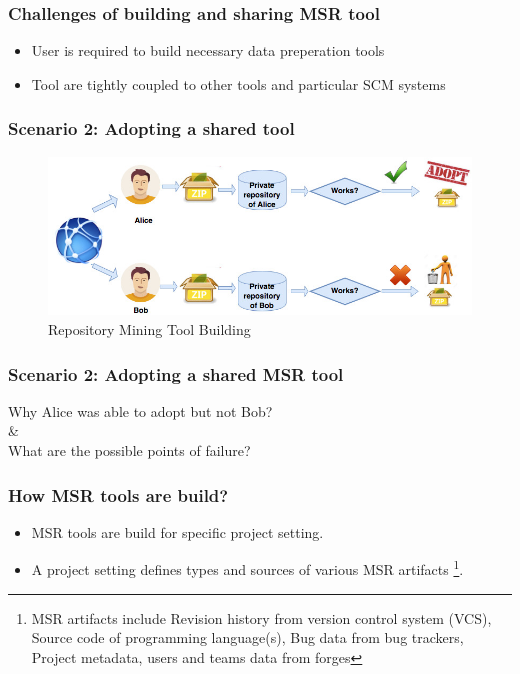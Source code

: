         \begin{frame}
            \frametitle{Challenges of building and sharing MSR tool}
            \begin{itemize}
                \item User is required to build necessary data preperation tools
                \item Tool are tightly coupled to other tools and particular SCM systems
             \end{itemize}
        \end{frame}

        \begin{frame}
            \frametitle{Scenario 2: Adopting a shared tool}
            \begin{figure}
                \centering
                \includegraphics[scale=0.35]{figures/adopting.jpg}
                \caption{Repository Mining Tool Building}
            \end{figure}
        \end{frame}


        \begin{frame}
            \frametitle{Scenario 2: Adopting a shared MSR tool}
             \centering
                Why Alice was able to adopt but not Bob? \\
                \& \\
                What are the possible points of failure?
        \end{frame}


        \begin{frame}
            \frametitle{How MSR tools are build?}
            \begin{itemize}
                \item MSR tools are build for specific project setting.
                \item A project setting defines types and sources of various MSR artifacts
                \footnote{
                        MSR artifacts include Revision history from version control system (VCS),
                        Source code of programming language(s), Bug data from bug trackers, Project metadata,
                        users and teams data from forges
                }.
            \end{itemize}
        \end{frame}


